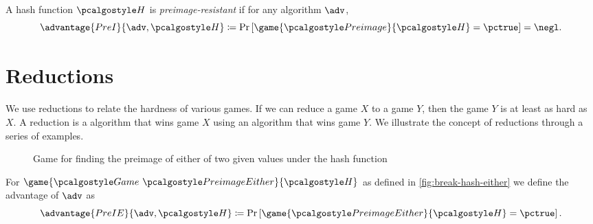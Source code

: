 \begin{definition}
  A hash function $\algo{H}$ is \emph{preimage-resistant} if for any \ppt algorithm $\adv$,
 \[
  \advantage{PreI}{\adv, \algo{H}} \defeq \pr{\game{\algo{Preimage}}{\algo{H}} = \pctrue} = \negl.
 \]
\end{definition}



\section{Reductions}
We use reductions to relate the hardness of various games.
If we can reduce a game $X$ to a game $Y$, then the game $Y$ is at least as hard as $X$.
A reduction is a \ppt algorithm that wins game $X$ using an algorithm that wins game $Y$.
We illustrate the concept of reductions through a series of examples.

\begin{figure}[tbhp]
  \begin{center}
    \begin{tcolorbox}[width=7cm]
      \begin{pchstack}[center]
      \end{pchstack}
    \end{tcolorbox}
  \end{center}
  \caption{Game for finding the preimage of either of two given values under the hash function \label{fig:break-hash-either}}
\end{figure}


\begin{definition}
  For $\game{\Game~\algo{PreimageEither}}{\algo{H}}$ as defined in \autoref{fig:break-hash-either} we define the advantage of $\adv$ as
 \[
  \advantage{PreIE}{\adv, \algo{H}} \defeq \pr{\game{\algo{PreimageEither}}{\algo{H}} = \pctrue}.
 \]
\end{definition}

